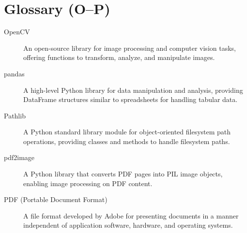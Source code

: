\section*{Glossary (O–P)}
\begin{description}
  \item[OpenCV] 
    An open-source library for image processing and computer vision tasks, offering 
    functions to transform, analyze, and manipulate images.
  \item[pandas] 
    A high-level Python library for data manipulation and analysis, providing DataFrame 
    structures similar to spreadsheets for handling tabular data.
  \item[Pathlib] 
    A Python standard library module for object-oriented filesystem path operations, 
    providing classes and methods to handle filesystem paths.
  \item[pdf2image] 
    A Python library that converts PDF pages into PIL image objects, enabling image 
    processing on PDF content.
  \item[PDF (Portable Document Format)] 
    A file format developed by Adobe for presenting documents in a manner independent 
    of application software, hardware, and operating systems.
\end{description}

